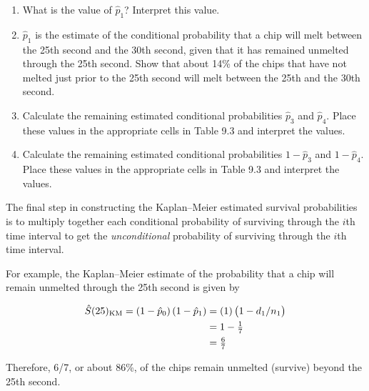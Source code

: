 \documentclass[
]{report}
\providecommand{\tightlist}{%
  \setlength{\itemsep}{0pt}\setlength{\parskip}{0pt}}
\begin{document}
\begin{enumerate}
\def\labelenumi{\arabic{enumi}.}
\setcounter{enumi}{8}
\tightlist
\item
  What is the value of \(\hat p_1\)? Interpret this value.\\
\item
  \(\hat p_1\) is the estimate of the conditional probability that a chip will melt between the 25th second and the 30th second, given that it has remained unmelted through the 25th second. Show that about 14\% of the chips that have not melted just prior to the 25th second will melt between the 25th and the 30th second.\\
\item
  Calculate the remaining estimated conditional probabilities \(\hat p_3\) and \(\hat p_4\). Place these values in the appropriate cells in Table 9.3 and interpret the values.\\
\item
  Calculate the remaining estimated conditional probabilities \(1 - \hat p_3\) and \(1 - \hat p_4\). Place these values in the appropriate cells in Table 9.3 and interpret the values.
\end{enumerate}

The final step in constructing the Kaplan--Meier estimated survival probabilities is to multiply together each conditional probability of surviving through the \(i\)th time interval to get the \emph{unconditional} probability of surviving through the \(i\)th time interval.

For example, the Kaplan--Meier estimate of the probability that a chip will remain unmelted through the 25th second is given by

\begin{align}
\hat S(25)_{\mathrm{KM}} = (1 - \hat p_0)\,(1 - \hat p_1) &= (1)\,\bigl(1 - d_1/n_1\bigr) \notag \\
&= 1 - \tfrac{1}{7} \notag \\ 
&= \tfrac{6}{7} \notag
\end{align}

Therefore, 6/7, or about 86\%, of the chips remain unmelted (survive) beyond the 25th second.

\large
\end{document}
